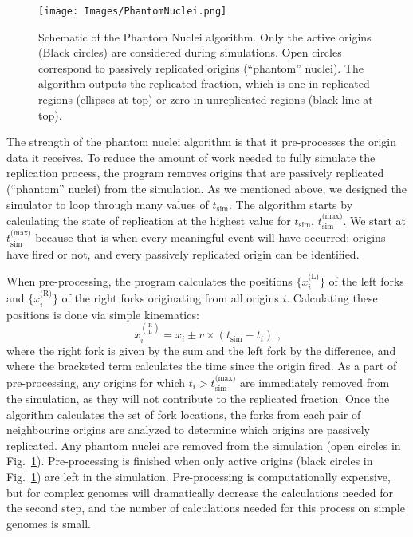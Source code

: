		\begin{figure}[tbh]
			\begin{center}
				\texttt{[image: Images/PhantomNuclei.png]}
			\end{center}
				\caption[Schematic of the Phantom Nuclei Algorithm]{\label{fig:phantom} Schematic of the Phantom Nuclei algorithm.
				Only the active origins (Black circles) are considered during simulations.
				Open circles correspond to passively replicated origins (``phantom'' nuclei).
				The algorithm outputs the replicated fraction, which is one in replicated regions (ellipses at top) or zero in unreplicated regions (black line at top).
				}
		\end{figure}
			
		The strength of the phantom nuclei algorithm is that it pre-processes the origin data it receives.
		To reduce the amount of work needed to fully simulate the replication process, the program removes origins that are passively replicated (``phantom'' nuclei) from the simulation.
		As we mentioned above, we designed the simulator to loop through many values of $t_\text{sim}$.
		The algorithm starts by calculating the state of replication at the highest value for $t_\text{sim}$, $t_\text{sim}^\text{(max)}$.
		We start at $t_\text{sim}^\text{(max)}$ because that is when every meaningful event will have occurred: origins have fired or not, and every passively replicated origin can be identified.
		
		When pre-processing, the program calculates the positions $\{x_i^\text{(L)}\}$ of the left forks and $\{x_i^\text{(R)}\}$ of the right forks originating from all origins $i$.
		Calculating these positions is done via simple kinematics:
		\begin{equation} \label{eq:findforks}
			x_i^{\binom{\text{R}}{\text{L}}} = x_i \pm v \times \left( t_\text{sim} - t_i\right) \text{ ,}
		\end{equation}
		where the right fork is given by the sum and the left fork by the difference, and where the bracketed term calculates the time since the origin fired.
		As a part of pre-processing, any origins for which $t_i > t_\text{sim}^\text{(max)}$ are immediately removed from the simulation, as they will not contribute to the replicated fraction.
		Once the algorithm calculates the set of fork locations, the forks from each pair of neighbouring origins are analyzed to determine which origins are passively replicated.
		Any phantom nuclei are removed from the simulation (open circles in Fig.~\ref{fig:phantom}).
		Pre-processing is finished when only active origins (black circles in Fig.~\ref{fig:phantom}) are left in the simulation.
		Pre-processing is computationally expensive, but for complex genomes will dramatically decrease the calculations needed for the second step, and the number of calculations needed for this process on simple genomes is small.
		
